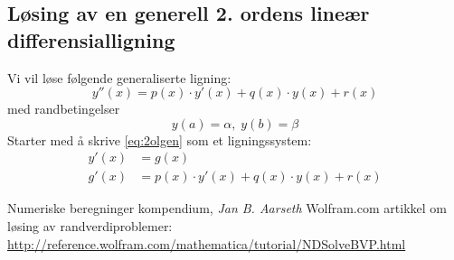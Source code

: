 



\subsection{Løsing av en generell 2. ordens lineær differensialligning} %
\label{sub:eksempel_l_sing_av_en_2_orden_line_r_differensialligning}
Vi vil løse følgende generaliserte ligning:
\begin{equation}
  y''(x) = p(x)\cdot y'(x) + q(x)\cdot y(x) + r(x) \label{eq:2olgen}
\end{equation}
med randbetingelser
\begin{equation}
  y(a) = \alpha, \; y(b) = \beta \tag{b}
\end{equation}
Starter med å skrive \eqref{eq:2olgen} som et ligningssystem:
\begin{align}
  y'(x) &= g(x) \\
  g'(x) &= p(x)\cdot y'(x) + q(x)\cdot y(x) + r(x)
\end{align}




\clearpage
\begin{thebibliography}{1}
   Numeriske beregninger kompendium, \emph{Jan B. Aarseth}
   Wolfram.com artikkel om løsing av randverdiproblemer: \\ \url{http://reference.wolfram.com/mathematica/tutorial/NDSolveBVP.html}
\end{thebibliography}


